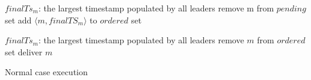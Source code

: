 \begin{algorithm*}
\begin{distribalgo}[1]
					\STATE $finalTs_m$: the largest timestamp populated by all leaders
					\STATE remove m from $pending$ set
					\STATE add $\langle m, finalTS_m \rangle$ to $ordered$ set
				\ENDWHILE

					\STATE $finalTs_m$: the largest timestamp populated by all leaders
					\STATE remove $m$ from $ordered$ set
					\STATE deliver $m$
				\ENDWHILE

			\ENDFOR			
		\ENDWHEN
	\ENDUPON
	\vspace{1.0mm}
\ENDINDENT

\vspace{2.0mm}


\caption{Normal case execution}
\label{alg:normal_case}
\end{distribalgo}
\end{algorithm*}
